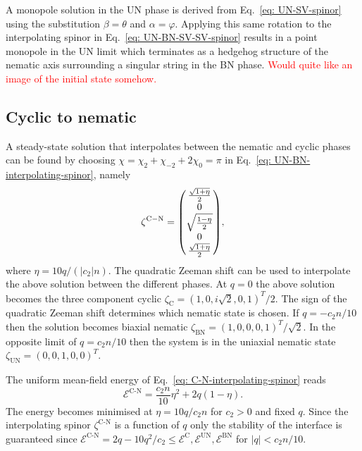 A monopole solution in the UN phase is derived from Eq.~\eqref{eq: UN-SV-spinor}
using the substitution \(\beta = \theta \) and \(\alpha=\varphi \).
Applying this same rotation to the interpolating spinor in
Eq.~\eqref{eq: UN-BN-SV-SV-spinor} results in a point monopole in the UN limit
which terminates as a hedgehog structure of the nematic axis surrounding a
singular string in the BN phase.
\textcolor{red}{Would quite like an image of the initial state somehow.}

\subsection{Cyclic to nematic}
A steady-state solution that interpolates between the nematic and cyclic phases
can be found by choosing \(\chi = \chi_2 + \chi_{-2} + 2\chi_0 = \pi\) in
Eq.~\eqref{eq: UN-BN-interpolating-spinor}, namely
\begin{equation}\label{eq: C-N-interpolating-spinor}
    \zeta^\mathrm{C-N} = \mqty(
    \frac{\sqrt{1 + \eta}}{2} \\
    0 \\
    \sqrt{\frac{1 - \eta}{2}} \\
    0 \\
    \frac{\sqrt{1 + \eta}}{2}),
\end{equation}
where \(\eta = 10q/(|c_2|n)\).
The quadratic Zeeman shift can be used to interpolate the above solution between
the different phases.
At \(q = 0\) the above solution becomes the three component cyclic
\(\zeta_\mathrm{C} = {(1, 0, i\sqrt{2}, 0, 1)}^T/2\).
The sign of the quadratic Zeeman shift determines which nematic state is chosen.
If \(q = -c_2n/10\) then the solution becomes biaxial nematic
\(\zeta_\mathrm{BN} = {(1, 0, 0, 0, 1)}^T/\sqrt{2}\).
In the opposite limit of \(q = c_2n/10\) then the system is in the uniaxial
nematic state \(\zeta_\mathrm{UN} = {(0, 0, 1, 0, 0)}^T\).

The uniform mean-field energy of Eq.~\eqref{eq: C-N-interpolating-spinor} reads
\begin{equation}
    \mathcal{E}^\text{C-N} = \frac{c_2n}{10}\eta^2 + 2q(1 - \eta).
\end{equation}
The energy becomes minimised at \(\eta = 10q/c_2n\) for \(c_2 > 0\) and fixed
\(q\).
Since the interpolating spinor \(\zeta^\text{C-N}\) is a function of \(q\) only
the stability of the interface is guaranteed since \(\mathcal{E}^\text{C-N} =
2q-10q^2/c_2 \leq \mathcal{E}^\text{C}, \mathcal{E}^\text{UN},
\mathcal{E}^\text{BN}\) for \(|q| < c_2n/10\).

